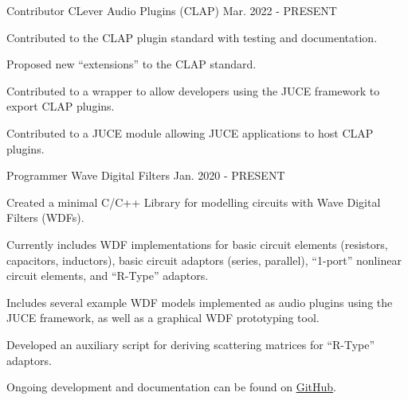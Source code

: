 \begin{cventries}
  \cventry
    {Contributor} %
    {CLever Audio Plugins (CLAP)} %
    {} %
    {Mar. 2022 - PRESENT} %
    {
      \begin{cvitems} %
        \item {Contributed to the CLAP plugin standard with testing and documentation.}
        \item {Proposed new ``extensions'' to the CLAP standard.}
        \item {Contributed to a wrapper to allow developers using the JUCE framework to export CLAP plugins.}
        \item {Contributed to a JUCE module allowing JUCE applications to host CLAP plugins.}
      \end{cvitems}
    }


  \cventry
    {Programmer} %
    {Wave Digital Filters} %
    {} %
    {Jan. 2020 - PRESENT} %
    {
      \begin{cvitems} %
        \item {Created a minimal C/C++ Library for modelling circuits with Wave Digital Filters (WDFs).}
        \item {Currently includes WDF implementations for basic circuit elements (resistors, capacitors, inductors),
               basic circuit adaptors (series, parallel), ``1-port'' nonlinear circuit elements, and ``R-Type'' adaptors.}
        \item {Includes several example WDF models implemented as audio plugins using the JUCE framework,
               as well as a graphical WDF prototyping tool.}
        \item {Developed an auxiliary script for deriving scattering matrices for ``R-Type'' adaptors.}
        \item {Ongoing development and documentation can be found on \href{https://github.com/jatinchowdhury18/WaveDigitalFilters}{GitHub}.}
      \end{cvitems}
    }



\end{cventries}
